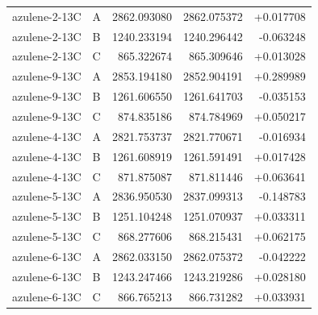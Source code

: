 \documentclass[12pt]{article}
\begin{document}
\begin{longtable}{llrrr}
azulene-2-13C & A & 2862.093080 & 2862.075372 & +0.017708 \\
azulene-2-13C & B & 1240.233194 & 1240.296442 & -0.063248 \\
azulene-2-13C & C & 865.322674 & 865.309646 & +0.013028 \\
azulene-9-13C & A & 2853.194180 & 2852.904191 & +0.289989 \\
azulene-9-13C & B & 1261.606550 & 1261.641703 & -0.035153 \\
azulene-9-13C & C & 874.835186 & 874.784969 & +0.050217 \\
azulene-4-13C & A & 2821.753737 & 2821.770671 & -0.016934 \\
azulene-4-13C & B & 1261.608919 & 1261.591491 & +0.017428 \\
azulene-4-13C & C & 871.875087 & 871.811446 & +0.063641 \\
azulene-5-13C & A & 2836.950530 & 2837.099313 & -0.148783 \\
azulene-5-13C & B & 1251.104248 & 1251.070937 & +0.033311 \\
azulene-5-13C & C & 868.277606 & 868.215431 & +0.062175 \\
azulene-6-13C & A & 2862.033150 & 2862.075372 & -0.042222 \\
azulene-6-13C & B & 1243.247466 & 1243.219286 & +0.028180 \\
azulene-6-13C & C & 866.765213 & 866.731282 & +0.033931 \\
\bottomrule
\end{longtable}
\end{document}
